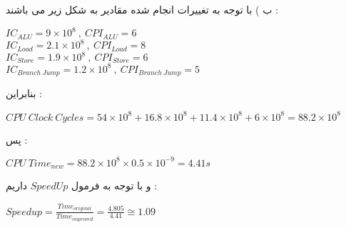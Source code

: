 \documentclass{article}
\begin{document}
ب ) با توجه به تغییرات انجام شده مقادیر به شکل زیر می باشند  : 
\begin{center}
	$IC_{ALU} = 9 \times 10^8 \ , \ 
	CPI_{ALU} = 6  $\\
	$ IC_{Load} = 2.1 \times 10^8 \ , \ 
	CPI_{Load} = 8$\\
	$ IC_{Store} = 1.9 \times 10^8 \ , \ 
	CPI_{Store} = 6$\\
	$IC_{Branch  \ Jump} = 1.2 \times 10^8 \ , \ 
	CPI_{Branch \ Jump} = 5 $
\end{center}
بنابراین  : 
\begin{center}
	$ CPU \ Clock \ Cycles = 54 \times 10^8 + 16.8 \times 10^8 + 11.4 \times 10^8  + 6 \times 10^8 = 88.2 \times 10^8$
\end{center}
پس  : 
\begin{center}
	$ CPU \ Time_{new}  = 88.2 \times 10^8 \times 0.5 \times 10^{-9} = 4.41s$
\end{center}
و با توجه به فرمول 
$SpeedUp$
داریم  : 
\begin{center}
	$Speedup = \frac{Time_{original} }{Time _{improved}} = \frac{4.805}{4.41} \cong 1.09$
\end{center}
\end{document}
